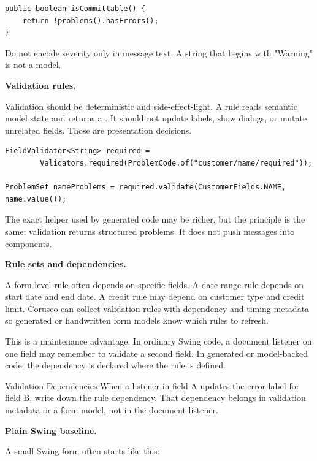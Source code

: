 \begin{lstlisting}[caption={Committability based on problem severity.}]
public boolean isCommittable() {
    return !problems().hasErrors();
}
\end{lstlisting}

Do not encode severity only in message text. A string that begins with "Warning"
is not a model.

\textbf{Validation rules.}

Validation should be deterministic and side-effect-light. A rule reads semantic
model state and returns a . It should not update labels, show
dialogs, or mutate unrelated fields. Those are presentation decisions.

\begin{lstlisting}[caption={Conceptual validation rule.}]
FieldValidator<String> required =
        Validators.required(ProblemCode.of("customer/name/required"));

ProblemSet nameProblems = required.validate(CustomerFields.NAME, name.value());
\end{lstlisting}

The exact helper used by generated code may be richer, but the principle is the
same: validation returns structured problems. It does not push messages into
components.

\textbf{Rule sets and dependencies.}

A form-level rule often depends on specific fields. A date range rule depends on
start date and end date. A credit rule may depend on customer type and credit
limit. Corusco  can collect validation rules with dependency and
timing metadata so generated or handwritten form models know which rules to
refresh.

This is a maintenance advantage. In ordinary Swing code, a document listener on
one field may remember to validate a second field. In generated or model-backed
code, the dependency is declared where the rule is defined.

\begin{migrationbox}{Validation Dependencies}
When a listener in field A updates the error label for field B, write down the
rule dependency. That dependency belongs in validation metadata or a form model,
not in the document listener.
\end{migrationbox}

\textbf{Plain Swing baseline.}

A small Swing form often starts like this:

